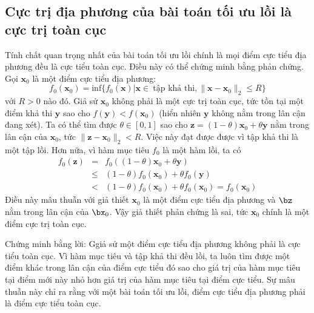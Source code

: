  
 
\subsection{Cực trị địa phương của bài toán tối ưu lồi là cực trị toàn cục} 

Tính chất quan trọng nhất của bài toán tối ưu lồi chính là mọi điểm cực tiểu địa phương đều là cực tiểu toàn cục. Điều này có thể chứng minh bằng phản chứng. Gọi
$\mathbf{x}_0$ là một điểm cực tiểu địa phương:
\begin{equation*} 
f_0(\mathbf{x}_0) = \text{inf} \{f_0(\mathbf{x}) | \mathbf{x} \in
~\text{tập khả thi}, \|\mathbf{x} - \mathbf{x}_0\|_2 \leq R\} \end{equation*}
với $R > 0$ nào đó. Giả sử $\mathbf{x}_0$ không phải là một cực trị toàn cục, tức tồn tại một điểm khả thi $\mathbf{y}$
sao cho $f(\mathbf{y}) < f(\mathbf{x}_0)$ (hiển nhiên $\mathbf{y}$ không
nằm trong lân cận đang xét). Ta có thể tìm được $\theta \in [0, 1]$ sao
cho $\mathbf{z} = (1 - \theta)\mathbf{x}_0 + \theta\mathbf{y}$ nằm trong lân cận
của $\mathbf{x}_0$, tức $\|\mathbf{z} - \mathbf{x}_0\|_2 < R$. Việc này đạt được được
vì tập khả thi là một tập lồi. Hơn nữa, vì {hàm mục tiêu} $f_0$ là một
hàm lồi, ta có 
\begin{eqnarray} 
    f_0(\mathbf{z}) &=& f_0((1 - \theta)\mathbf{x}_0 + \theta \mathbf{y})  \\\ 
                    &\leq& (1 - \theta)f_0(\mathbf{x}_0) + \theta f_0(\mathbf{y})\\\ 
                    & < & (1 - \theta)f_0(\mathbf{x}_0) + \theta f_0(\mathbf{x}_0) 
                    = f_0(\mathbf{x}_0) 
\end{eqnarray} 
Điều này mâu thuẫn với giả thiết $\mathbf{x}_0$ là một điểm cực tiểu địa phương và $\bz$ nằm trong lân cận của $\bx_0$. Vậy giả thiết phản chứng là
sai, tức $\mathbf{x}_0$ chính là một điểm cực trị toàn cục. \dpcm 
 
Chứng minh bằng lời: Ggiả sử một điểm cực tiểu địa phương không phải là cực tiểu toàn cục. Vì hàm mục tiêu và tập khả thi đều lồi, ta luôn tìm được một điểm khác trong lân cận của điểm cực tiểu đó
sao cho giá trị của hàm mục tiêu tại điểm mới này nhỏ hơn giá trị của hàm mục
tiêu tại điểm cực tiểu. Sự mâu thuẫn này chỉ ra rằng với một bài toán tối ưu
lồi, điểm cực tiểu địa phương phải là điểm cực tiểu toàn cục. 
 
 

